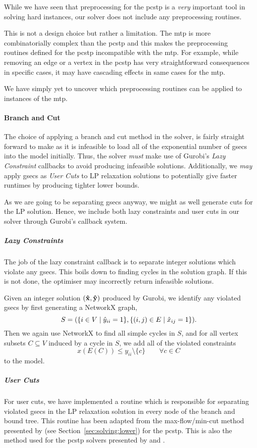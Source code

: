While we have seen that preprocessing for the \gls{pcstp} is a \textit{very} important
tool in solving hard instances, our solver does not include any preprocessing routines.

This is not a design choice but rather a limitation. The \gls{mtp} is
more combinatorially
complex than the \gls{pcstp} and this makes the preprocessing routines defined for
the \gls{pcstp} incompatible with the \gls{mtp}.
For example, while removing an edge or a vertex in the \gls{pcstp}
has very straightforward consequences in
specific cases, it may have cascading effects in same cases for the \gls{mtp}.

We have simply yet to uncover which preprocessing routines can be applied to instances of
the \gls{mtp}.

\paragraph{Branch and Cut}
The choice of applying a branch and cut method in the solver, is fairly straight
forward to make as it is infeasible to load all of the exponential number of
\glspl{gsec} into the model initially. Thus, the solver
\textit{must} make use of
Gurobi's \textit{Lazy Constraint} callbacks to avoid producing infeasible solutions.
Additionally, we \textit{may} apply \glspl{gsec} as
\textit{User Cuts} to LP relaxation solutions to potentially
give faster runtimes by producing tighter lower bounds.

As we are going to be separating \glspl{gsec} anyway, we might as well generate cuts
for the LP solution. Hence, we include both lazy constraints and user cuts
in our solver through Gurobi's callback system.
\subparagraph{Lazy Constraints}
The job of the lazy constraint callback is to separate integer solutions
which violate any \glspl{gsec}. This boils down to finding cycles in the solution
graph. If this is not done, the optimiser may incorrectly return infeasible solutions.

Given an integer solution $(\mathbf{\hat{x}}, \mathbf{\hat{y}})$ produced by Gurobi, we
identify any violated \glspl{gsec} by first generating a NetworkX graph,
\[S = (\{i \in V \mid \hat y_{ii} = 1 \}, \{ (i, j) \in E \mid \hat x_{ij} = 1\})\mathnormal{.}\]
Then we again use NetworkX to find all simple cycles in $S$, and for all vertex
subsets $C \subseteq V$ induced by a cycle
in $S$, we add all of the violated constraints
\[x(E(C)) \leq y_{ii} \setminus \{c\} \qquad \forall c \in C\]
to the model.
\subparagraph{User Cuts}
For user cuts, we have implemented a routine which is
responsible for separating violated \glspl{gsec} in the LP relaxation solution in every node of
the branch and bound tree.
This routine has been adapted from the max-flow/min-cut method presented by \citet{lucena2004strong}
 (see Section~\ref{sec:solving:lower}) for the \gls{pcstp}.
 This is also the method used for the \gls{pcstp} solvers presented by
 \citet{ljubic2005solving} and \citet{gamrath2017scip}.


